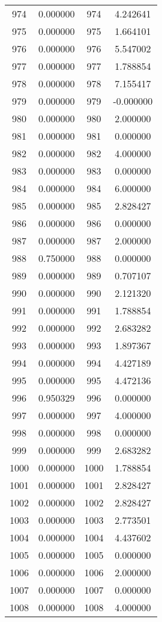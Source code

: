 \documentclass[12pt]{article}
\begin{document}
\begin{longtable}{@{}cccc@{}}
974 & 0.000000 & 974 & 4.242641 \\
975 & 0.000000 & 975 & 1.664101 \\
976 & 0.000000 & 976 & 5.547002 \\
977 & 0.000000 & 977 & 1.788854 \\
978 & 0.000000 & 978 & 7.155417 \\
979 & 0.000000 & 979 & -0.000000 \\
980 & 0.000000 & 980 & 2.000000 \\
981 & 0.000000 & 981 & 0.000000 \\
982 & 0.000000 & 982 & 4.000000 \\
983 & 0.000000 & 983 & 0.000000 \\
984 & 0.000000 & 984 & 6.000000 \\
985 & 0.000000 & 985 & 2.828427 \\
986 & 0.000000 & 986 & 0.000000 \\
987 & 0.000000 & 987 & 2.000000 \\
988 & 0.750000 & 988 & 0.000000 \\
989 & 0.000000 & 989 & 0.707107 \\
990 & 0.000000 & 990 & 2.121320 \\
991 & 0.000000 & 991 & 1.788854 \\
992 & 0.000000 & 992 & 2.683282 \\
993 & 0.000000 & 993 & 1.897367 \\
994 & 0.000000 & 994 & 4.427189 \\
995 & 0.000000 & 995 & 4.472136 \\
996 & 0.950329 & 996 & 0.000000 \\
997 & 0.000000 & 997 & 4.000000 \\
998 & 0.000000 & 998 & 0.000000 \\
999 & 0.000000 & 999 & 2.683282 \\
1000 & 0.000000 & 1000 & 1.788854 \\
1001 & 0.000000 & 1001 & 2.828427 \\
1002 & 0.000000 & 1002 & 2.828427 \\
1003 & 0.000000 & 1003 & 2.773501 \\
1004 & 0.000000 & 1004 & 4.437602 \\
1005 & 0.000000 & 1005 & 0.000000 \\
1006 & 0.000000 & 1006 & 2.000000 \\
1007 & 0.000000 & 1007 & 0.000000 \\
1008 & 0.000000 & 1008 & 4.000000 \\

\end{longtable}
\end{document}
